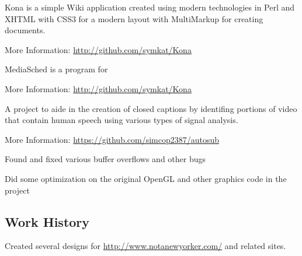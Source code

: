 \documentclass[table]{resume}
\begin{document}

\begin{compactitem}
\item Kona is a simple Wiki application created using modern technologies in Perl and XHTML 
with CSS3 for a modern layout with MultiMarkup for creating documents.
\item More Information: \url{http://github.com/symkat/Kona}
\end{compactitem}


\begin{compactitem}
\item MediaSched is a program for 
\item More Information: \url{http://github.com/symkat/Kona}
\end{compactitem}


\begin{compactitem}
\item A project to aide in the creation of closed captions by identifing portions of 
video that contain human speech using various types of signal analysis.
\item More Information: \url{https://github.com/simcop2387/autosub}
\end{compactitem}


\begin{compactitem}
\item Found and fixed various buffer overflows and other bugs
\item Did some optimization on the original OpenGL and other graphics code in the project
\end{compactitem}

\subsection{Work History}

\begin{compactitem}
\item Created several designs for \url{http://www.notanewyorker.com/} and related sites.
\end{compactitem}
\end{document}
